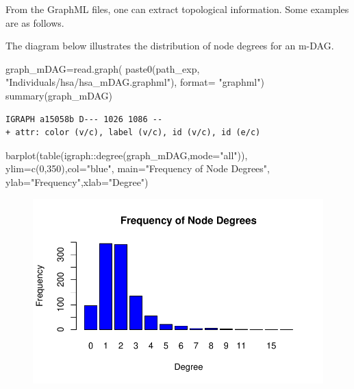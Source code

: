 \documentclass[
  letterpaper,
  DIV=11,
  numbers=noendperiod]{scrreprt}
\newenvironment{Shaded}{}{}
\newcommand{\AttributeTok}[1]{\textcolor[rgb]{0.78,0.47,0.87}{#1}}
\newcommand{\DecValTok}[1]{\textcolor[rgb]{0.82,0.60,0.40}{#1}}
\newcommand{\FunctionTok}[1]{\textcolor[rgb]{0.38,0.69,0.94}{#1}}
\newcommand{\NormalTok}[1]{\textcolor[rgb]{0.67,0.70,0.75}{#1}}
\newcommand{\OtherTok}[1]{\textcolor[rgb]{0.15,0.68,0.38}{#1}}
\newcommand{\SpecialCharTok}[1]{\textcolor[rgb]{0.34,0.71,0.76}{#1}}
\newcommand{\StringTok}[1]{\textcolor[rgb]{0.60,0.76,0.47}{#1}}
\begin{document}
From the GraphML files, one can extract topological information. Some
examples are as follows.

The diagram below illustrates the distribution of node degrees for an
m-DAG.

\begin{Shaded}
\begin{Highlighting}[]
\NormalTok{graph\_mDAG}\OtherTok{=}\FunctionTok{read.graph}\NormalTok{(}
  \FunctionTok{paste0}\NormalTok{(path\_exp,}
         \StringTok{"Individuals/hsa/hsa\_mDAG.graphml"}\NormalTok{),}
  \AttributeTok{format=} \StringTok{"graphml"}\NormalTok{)}
\FunctionTok{summary}\NormalTok{(graph\_mDAG)}
\end{Highlighting}
\end{Shaded}

\begin{verbatim}
IGRAPH a15058b D--- 1026 1086 -- 
+ attr: color (v/c), label (v/c), id (v/c), id (e/c)
\end{verbatim}

\begin{Shaded}
\begin{Highlighting}[]
\FunctionTok{barplot}\NormalTok{(}\FunctionTok{table}\NormalTok{(igraph}\SpecialCharTok{::}\FunctionTok{degree}\NormalTok{(graph\_mDAG,}\AttributeTok{mode=}\StringTok{"all"}\NormalTok{)),}
              \AttributeTok{ylim=}\FunctionTok{c}\NormalTok{(}\DecValTok{0}\NormalTok{,}\DecValTok{350}\NormalTok{),}\AttributeTok{col=}\StringTok{"blue"}\NormalTok{,}
              \AttributeTok{main=}\StringTok{"Frequency of Node Degrees"}\NormalTok{,}
              \AttributeTok{ylab=}\StringTok{"Frequency"}\NormalTok{,}\AttributeTok{xlab=}\StringTok{"Degree"}\NormalTok{)}
\end{Highlighting}
\end{Shaded}

\begin{figure}[H]

{\centering \includegraphics[width=1\textwidth,height=\textheight]{index_files/figure-pdf/unnamed-chunk-21-1.pdf}

}

\end{figure}
\end{document}
